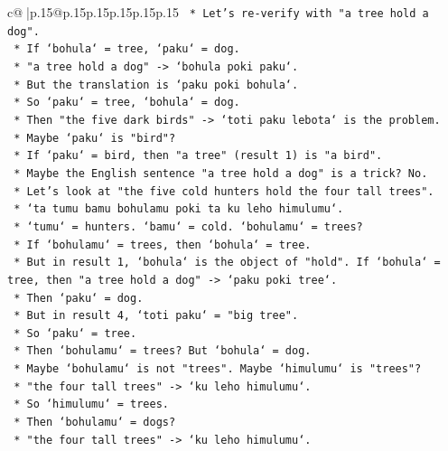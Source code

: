 \documentclass{article}
\begin{document}
{\begin{supertabular}{c@{$\;$}|p{.15\linewidth}@{}p{.15\linewidth}p{.15\linewidth}p{.15\linewidth}p{.15\linewidth}p{.15\linewidth}}
{{{\texttt{            *   Let's re{-}verify with "a tree hold a dog".} \\
\texttt{            *   If `bohula` = tree, `paku` = dog.} \\
\texttt{            *   "a tree hold a dog" {-}> `bohula poki paku`.} \\
\texttt{            *   But the translation is `paku poki bohula`.} \\
\texttt{            *   So `paku` = tree, `bohula` = dog.} \\
\texttt{            *   Then "the five dark birds" {-}> `toti paku lebota` is the problem.} \\
\texttt{            *   Maybe `paku` is "bird"?} \\
\texttt{            *   If `paku` = bird, then "a tree" (result 1) is "a bird".} \\
\texttt{            *   Maybe the English sentence "a tree hold a dog" is a trick? No.} \\
\texttt{            *   Let's look at "the five cold hunters hold the four tall trees".} \\
\texttt{            *   `ta tumu bamu bohulamu poki ta ku leho himulumu`.} \\
\texttt{            *   `tumu` = hunters. `bamu` = cold. `bohulamu` = trees?} \\
\texttt{            *   If `bohulamu` = trees, then `bohula` = tree.} \\
\texttt{            *   But in result 1, `bohula` is the object of "hold". If `bohula` = tree, then "a tree hold a dog" {-}> `paku poki tree`.} \\
\texttt{            *   Then `paku` = dog.} \\
\texttt{            *   But in result 4, `toti paku` = "big tree".} \\
\texttt{            *   So `paku` = tree.} \\
\texttt{            *   Then `bohulamu` = trees? But `bohula` = dog.} \\
\texttt{            *   Maybe `bohulamu` is not "trees". Maybe `himulumu` is "trees"?} \\
\texttt{            *   "the four tall trees" {-}> `ku leho himulumu`.} \\
\texttt{            *   So `himulumu` = trees.} \\
\texttt{            *   Then `bohulamu` = dogs?} \\
\texttt{            *   "the four tall trees" {-}> `ku leho himulumu`.} \\
}}}
\end{supertabular}}
\end{document}
